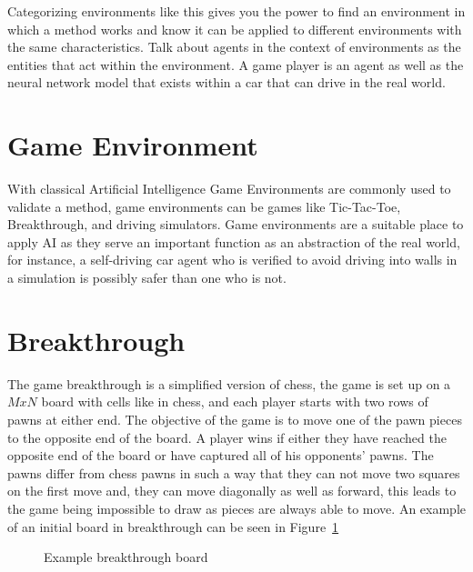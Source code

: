 Categorizing environments like this gives you the power to find an environment in which a method works and know it can be applied to different environments with the same characteristics. Talk about agents in the context of environments as the entities that act within the environment. A game player is an agent as well as the neural network model that exists within a car that can drive in the real world.

\section{Game Environment}

With classical Artificial Intelligence Game Environments are commonly used to validate a method, game environments can be games like Tic-Tac-Toe, Breakthrough, and driving simulators. Game environments are a suitable place to apply AI as they serve an important function as an abstraction of the real world, for instance, a self-driving car agent who is verified to avoid driving into walls in a simulation is possibly safer than one who is not.

\section{Breakthrough}

The game breakthrough is a simplified version of chess, the game is set up on a $MxN$ board with cells like in chess, and each player starts with two rows of pawns at either end. The objective of the game is to move one of the pawn pieces to the opposite end of the board. A player wins if either they have reached the opposite end of the board or have captured all of his opponents' pawns. The pawns differ from chess pawns in such a way that they can not move two squares on the first move and, they can move diagonally as well as forward, this leads to the game being impossible to draw as pieces are always able to move. An example of an initial board in breakthrough can be seen in Figure~\ref{fig:initbtboard}

\begin{figure}[]
  \centering


  \caption{Example breakthrough board}
  \label{fig:initbtboard}
\end{figure}


